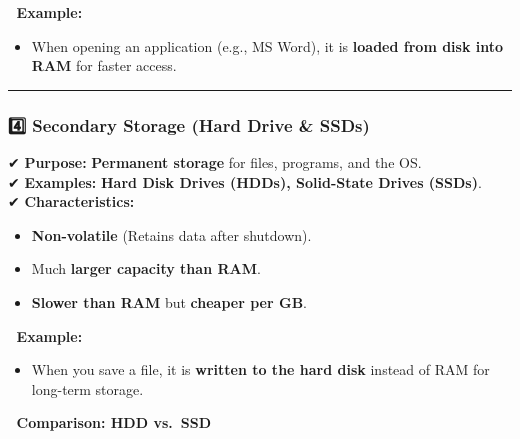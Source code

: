 \documentclass[
]{article}
\providecommand{\tightlist}{%
  \setlength{\itemsep}{0pt}\setlength{\parskip}{0pt}}
\begin{document}
📌 \textbf{Example:}

\begin{itemize}
\tightlist
\item
  When opening an application (e.g., MS Word), it is \textbf{loaded from
  disk into RAM} for faster access.
\end{itemize}

\begin{center}\rule{0.5\linewidth}{0.5pt}\end{center}

\subsubsection{\texorpdfstring{\textbf{4️⃣ Secondary Storage (Hard Drive
\&
SSDs)}}{4️⃣ Secondary Storage (Hard Drive \& SSDs)}}\label{secondary-storage-hard-drive-ssds}

✔ \textbf{Purpose:} \textbf{Permanent storage} for files, programs, and
the OS.\\
✔ \textbf{Examples:} \textbf{Hard Disk Drives (HDDs), Solid-State Drives
(SSDs)}.\\
✔ \textbf{Characteristics:}

\begin{itemize}
\tightlist
\item
  \textbf{Non-volatile} (Retains data after shutdown).
\item
  Much \textbf{larger capacity than RAM}.
\item
  \textbf{Slower than RAM} but \textbf{cheaper per GB}.
\end{itemize}

📌 \textbf{Example:}

\begin{itemize}
\tightlist
\item
  When you save a file, it is \textbf{written to the hard disk} instead
  of RAM for long-term storage.
\end{itemize}

📌 \textbf{Comparison: HDD vs.~SSD}
\end{document}
